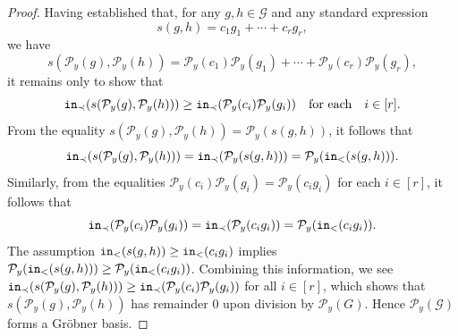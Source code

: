 \documentclass[10pt,a4paper]{amsart}
\newcommand{\G}{\mathcal{G}}
\renewcommand{\P}{\mathcal{P}}
\newcommand{\init}{{\tt in}}
\newcommand{\qforeach}{\quad \mbox{for each} \quad}
\begin{document}
\begin{proof}
Having established that, for any $g, h \in \G$ and any standard expression \[
s(g,h) = c_1g_1+\cdots+c_rg_r,
\] we have \[
 s(\P_y(g),\P_y(h)) = \P_y(c_1)\P_y(g_1)+\cdots+\P_y(c_r)\P_y(g_r),
\] it remains only to show that \[
\init_\prec(s(\P_y(g),\P_y(h))) \geq \init_\prec(\P_y(c_i)\P_y(g_i)) \qforeach  i \in [r].
\] From the equality $s(\P_y(g),\P_y(h)) = \P_y(s(g, h))$, it follows that \[
\init_\prec(s(\P_y(g),\P_y(h))) = \init_\prec(\P_y(s(g, h))) = \P_y(\init_<(s(g,h))).
\] Similarly, from the equalities $\P_y(c_i)\P_y(g_i) = \P_y(c_ig_i)$ for each $i \in [r]$, it follows that \[
\init_\prec(\P_y(c_i)\P_y(g_i)) = \init_\prec(\P_y(c_ig_i)) = \P_y(\init_<(c_ig_i)).
\]
The assumption $\init_<(s(g,h)) \geq \init_<(c_ig_i)$ implies $\P_y(\init_<(s(g,h))) \geq \P_y(\init_<(c_ig_i))$.  Combining this information, we see $\init_\prec(s(\P_y(g),\P_y(h))) \geq \init_\prec(\P_y(c_i)\P_y(g_i))$ for all $i \in [r]$, which shows that $s(\P_y(g),\P_y(h))$ has remainder $0$ upon division by $\P_y(G)$.  Hence $\P_y(\G)$ forms a Gr\"obner basis.
\end{proof}
\end{document}
